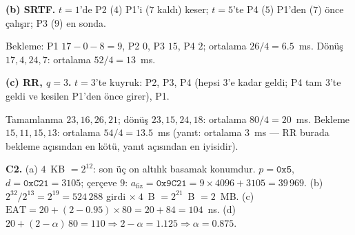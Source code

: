 \documentclass[11pt,a4paper]{article}
\begin{document}
\textbf{(b) SRTF.} $t=1$'de P2 ($4$) P1'i ($7$ kaldı) keser; $t=5$'te P4 ($5$) P1'den ($7$) önce çalışır; P3 ($9$) en sonda.
\begin{center}\end{center}
Bekleme: P1 $17-0-8 = 9$, P2 $0$, P3 $15$, P4 $2$; ortalama $26/4 = 6.5$~ms. Dönüş $17, 4, 24, 7$: ortalama $52/4 = 13$~ms.

\textbf{(c) RR, $q=3$.} $t=3$'te kuyruk: P2, P3, P4 (hepsi $3$'e kadar geldi; P4 tam $3$'te geldi ve kesilen P1'den önce girer), P1.
\begin{center}\end{center}
Tamamlanma $23, 16, 26, 21$; dönüş $23, 15, 24, 18$: ortalama $80/4 = 20$~ms. Bekleme $15, 11, 15, 13$: ortalama $54/4 = 13.5$~ms (yanıt: ortalama $3$~ms --- RR burada bekleme açısından en kötü, yanıt açısından en iyisidir).

\textbf{C2.} (a) $4$~KB $= 2^{12}$: son üç on altılık basamak konumdur. $p = \texttt{0x5}$, $d = \texttt{0xC21} = 3105$; çerçeve $9$: $a_{\text{fiz}} = \texttt{0x9C21} = 9 \times 4096 + 3105 = 39\,969$. (b) $2^{32}/2^{13} = 2^{19} = 524\,288$ girdi $\times\ 4$~B $= 2^{21}$~B $= 2$~MB. (c) $\text{EAT} = 20 + (2 - 0.95) \times 80 = 20 + 84 = 104$~ns. (d) $20 + (2-\alpha)\,80 = 110 \Rightarrow 2 - \alpha = 1.125 \Rightarrow \alpha = 0.875$.
\end{document}
